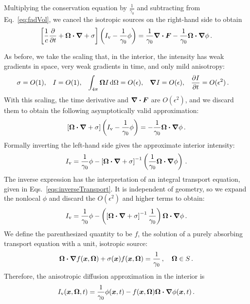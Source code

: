 Multiplying the conservation equation by $\frac{1}{\gamma_0}$ and subtracting
from Eq.~\eqref{eq:fadVol}, we cancel the isotropic sources on the right-hand
side to obtain
\begin{equation*}
  \left[ \frac{1}{c}\frac{\partial }{\partial t}
  + \bm{\Omega}\bm{\cdot} \bm{\nabla}
  + \sigma \right]
   \left( I_\mathrm{v}
  - \frac{1}{\gamma_0} \phi \right)
  = \frac{1}{\gamma_0} \bm{\nabla} \bm{\cdot}\bm{F} -
  \frac{1}{\gamma_0} \bm{\Omega}\bm{\cdot} \bm{\nabla} \phi\,.
\end{equation*}

As before, we take the scaling that, in the interior, the intensity has weak
gradients in space, very weak gradients in time, and only mild anisotropy:
\begin{align} \tagref{eq:ansatz}
  \sigma &= O(1), &
  I &= O(1), &
  \int_{4\pi} \vec{\Omega} I \ud\Omega &= O(\epsilon), &
  \grad I &= O(\epsilon), &
  \pder{I}{t} &= O(\epsilon^2) \,.
\end{align}
With this scaling, the time derivative and $\bm{\nabla} \bm{\cdot}\bm{F}$ are
$O(\epsilon^2)$, and we discard them to obtain the following asymptotically
valid approximation:
\begin{equation*}
  \left[ \bm{\Omega}\bm{\cdot} \bm{\nabla} + \sigma \right]
  \left( I_\mathrm{v} - \frac{1}{\gamma_0} \phi \right)
  =  -\frac{1}{\gamma_0} \bm{\Omega}\bm{\cdot} \bm{\nabla} \phi\,.
\end{equation*}
Formally inverting the left-hand side gives the approximate interior
intensity:
\begin{equation*}
  I_\mathrm{v} = \frac{1}{\gamma_0} \phi 
  - \left[ \bm{\Omega}\bm{\cdot} \bm{\nabla} + \sigma \right]^{-1} \left( \frac{1}{\gamma_0}
  \bm{\Omega}\bm{\cdot} \bm{\nabla} \phi \right)\,.
\end{equation*}
The inverse expression has the interpretation of an integral transport equation,
given in Eqs.~\eqref{eqs:inverseTransport}. It is independent of geometry, so we
expand the nonlocal $\phi$ and discard the $O(\epsilon^2)$ and higher terms to
obtain:
\begin{equation*}
  I_\mathrm{v} = \frac{1}{\gamma_0} \phi 
  - \left( \left[ \bm{\Omega}\bm{\cdot} \bm{\nabla} + \sigma \right]^{-1} \frac{1}{\gamma_0}
  \right) \bm{\Omega}\bm{\cdot} \bm{\nabla} \phi \,.
\end{equation*}
We define the parenthesized quantity to be $f$, the solution of a purely
absorbing transport equation with a unit, isotropic source:
\begin{equation} \label{eq:fadFVol}
  \bm{\Omega}\bm{\cdot} \bm{\nabla} f(\bm{x}, \bm{\Omega})
  + \sigma(\bm{x}) f (\bm{x}, \bm{\Omega})
= \frac{1}{\gamma_0} \,, \quad \bm{\Omega} \in S\,.
\end{equation}
Therefore, the anisotropic diffusion approximation in the interior is
\begin{equation}\label{eq:fadVolApproxFinal}
  I_\mathrm{v}(\bm{x},\bm{\Omega},t)
  = \frac{1}{\gamma_0} \phi(\bm{x},t)
  - f(\bm{x}, \bm{\Omega}) \bm{\Omega}\bm{\cdot} \bm{\nabla} \phi(\bm{x},t) \,.
\end{equation}

